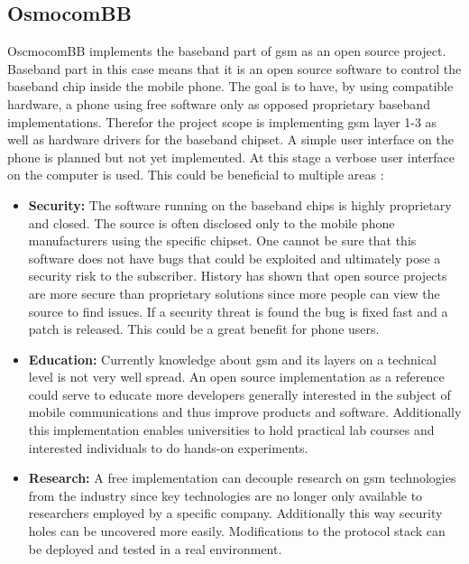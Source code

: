 \subsection{OsmocomBB}
OscmocomBB implements the baseband part of \gls{gsm} as an open source project.
Baseband part in this case means that it is an open source software to control the baseband chip inside the mobile phone.
The goal is to have, by using compatible hardware, a phone using free software only as opposed proprietary baseband implementations.
Therefor the project scope is implementing \gls{gsm} layer 1-3 as well as hardware drivers for the baseband chipset.
A simple user interface on the phone is planned but not yet implemented.
At this stage a verbose user interface on the computer is used.
This could be beneficial to multiple areas \cite{osmo_rationale}:
\begin{itemize}
	\item \textbf{Security:} The software running on the baseband chips is highly proprietary and closed.
	The source is often disclosed only to the mobile phone manufacturers using the specific chipset.
	One cannot be sure that this software does not have bugs that could be exploited and ultimately pose a security risk to the subscriber.
	History has shown that open source projects are more secure than proprietary solutions since more people can view the source to find issues.
	If a security threat is found the bug is fixed fast and a patch is released.
	This could be a great benefit for phone users.
	\item \textbf{Education:} Currently knowledge about \gls{gsm} and its layers on a technical level is not very well spread.
	An open source implementation as a reference could serve to educate more developers generally interested in the subject of mobile communications and thus improve products and software.
	Additionally this implementation enables universities to hold practical lab courses and interested individuals to do hands-on experiments.
	\item \textbf{Research:} A free implementation can decouple research on \gls{gsm} technologies from the industry since key technologies are no longer only available to researchers employed by a specific company.
	Additionally this way security holes can be uncovered more easily.
	Modifications to the protocol stack can be deployed and tested in a real environment.
\end{itemize}

